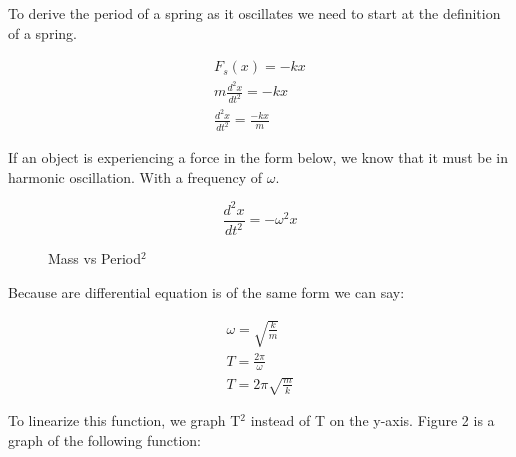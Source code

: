 \documentclass{article}
\begin{document}
To derive the period of a spring as it oscillates we need to start at the definition of a spring.



\begin{gather}
F_s(x) = -kx \\
m\frac{d^2x}{dt^2} = -kx \\ 
\frac{d^2x}{dt^2} = \frac{-kx}{m}
\end{gather}



If an object is experiencing a force in the form below, we know that it must be in harmonic oscillation. With a frequency of $\omega$.

\[
\frac{d^2x}{dt^2} = -\omega^2x
\]

\datatable



\begin{wrapfigure}{R}{0.5\textwidth}
\caption{Mass vs Period$^2$}
\end{wrapfigure}

Because are differential equation is of the same form we can say:

\begin{gather}
\omega = \sqrt{\frac{k}{m}} \\
T = \frac{2\pi}{\omega} \\
T = 2\pi\sqrt{\frac{m}{k}}
\end{gather}

To linearize this function, we graph T$^2$ instead of T on the y-axis. Figure 2 is a graph of the following function:
\end{document}
